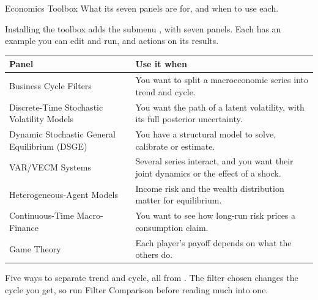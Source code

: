 
\renewcommand{\vignetteauthor}{Pollis}
\renewcommand{\vignettedate}{1 November 2026}
\renewcommand{\vignettelicense}{AGPL-3.0}



  {Economics Toolbox}
  {What its seven panels are for, and when to use each.}

Installing the toolbox adds the submenu , with seven panels. Each has an example you can edit and run, and actions on its results.

\medskip
{\small
\begin{tabularx}{\linewidth}{@{}>{\raggedright\arraybackslash}p{62mm}X@{}}
\toprule
\textbf{Panel} & \textbf{Use it when} \\\midrule
Business Cycle Filters & You want to split a macroeconomic series into trend and cycle. \\
Discrete-Time Stochastic Volatility Models & You want the path of a latent volatility, with its full posterior uncertainty. \\
Dynamic Stochastic General Equilibrium (DSGE) & You have a structural model to solve, calibrate or estimate. \\
VAR/VECM Systems & Several series interact, and you want their joint dynamics or the effect of a shock. \\
Heterogeneous-Agent Models & Income risk and the wealth distribution matter for equilibrium. \\
Continuous-Time Macro-Finance & You want to see how long-run risk prices a consumption claim. \\
Game Theory & Each player's payoff depends on what the others do. \\\bottomrule
\end{tabularx}}


Five ways to separate trend and cycle, all from . The filter chosen changes the cycle you get, so run Filter Comparison before reading much into one.

